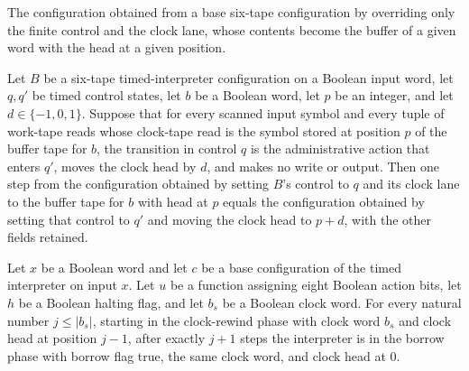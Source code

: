 \begin{definition}
\label{Turing.timedClockCfg}
\leanok
{}
The configuration obtained from a base six-tape configuration by overriding
only the finite control and the clock lane, whose contents become the buffer
of a given word with the head at a given position.
\end{definition}

\begin{lemma}
\label{Turing.timedClock_step}
\leanok
{}
Let $B$ be a six-tape timed-interpreter configuration on a Boolean input word, let
$q,q'$ be timed control states, let $b$ be a Boolean word, let $p$ be an integer, and
let $d\in\{-1,0,1\}$. Suppose that for every scanned input symbol and every tuple of
work-tape reads whose clock-tape read is the symbol stored at position $p$ of the buffer
tape for $b$, the transition in control $q$ is the administrative action that enters
$q'$, moves the clock head by $d$, and makes no write or output. Then one step from the
configuration obtained by setting $B$'s control to $q$ and its clock lane to the buffer
tape for $b$ with head at $p$ equals the configuration obtained by setting that control
to $q'$ and moving the clock head to $p+d$, with the other fields retained.
\end{lemma}

\begin{lemma}
\label{Turing.timed_clock_back}
\leanok
{}
Let $x$ be a Boolean word and let $c$ be a base configuration of the timed interpreter
on input $x$. Let $u$ be a function assigning eight Boolean action bits, let $h$ be a
Boolean halting flag, and let $b_s$ be a Boolean clock word. For every natural number
$j\le |b_s|$, starting in the clock-rewind phase with clock word $b_s$ and clock head at
position $j-1$, after exactly $j+1$ steps the interpreter is in the borrow phase with
borrow flag true, the same clock word, and clock head at $0$.
\end{lemma}

